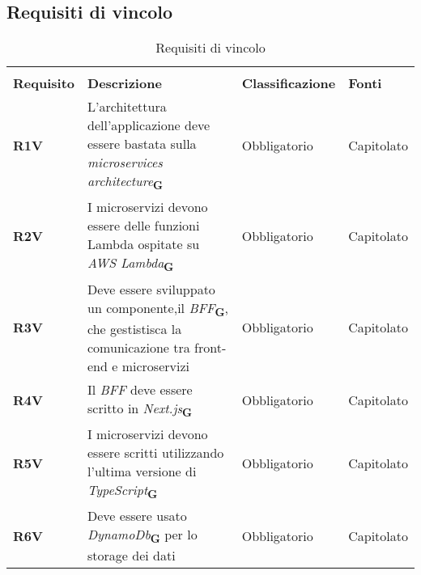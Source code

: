 \subsection{Requisiti di vincolo}
\begin{center}
    \centering
    \renewcommand{\arraystretch}{1.8}
    \label{tab:RequisitiVincolo}
    \begin{longtable}[!h]{p{50px} p{200px} p{100px} p{50px}}
        \rowcolor{white}\caption{Requisiti di vincolo}\\
 \rowcolor{logo!70} \textbf{Requisito} & \textbf{Descrizione}                                                                                                                                     & \textbf{Classificazione} & \textbf{Fonti} \\
        \textbf{R1V}                          & L'architettura dell'applicazione deve essere bastata sulla \textit{microservices architecture}\textsubscript{\textbf{G}}                                 & Obbligatorio             & Capitolato     \\
        \textbf{R2V}                          & I microservizi devono essere delle funzioni \newline Lambda ospitate su \textit{AWS Lambda}\textsubscript{\textbf{G}}                                    & Obbligatorio             & Capitolato     \\
        \textbf{R3V}                          & Deve essere sviluppato un componente,\newline il \textit{BFF}\textsubscript{\textbf{G}}, che gestistisca la comunicazione tra front-end e microservizi   & Obbligatorio             & Capitolato     \\
        \textbf{R4V}                          & Il \textit{BFF} deve essere scritto in \textit{Next.js}\textsubscript{\textbf{G}}                                                                        & Obbligatorio             & Capitolato     \\
        \textbf{R5V}                          & I microservizi devono essere scritti utilizzando l'ultima versione di \textit{TypeScript}\textsubscript{\textbf{G}}                                      & Obbligatorio             & Capitolato     \\
        \textbf{R6V}                          & Deve essere usato \textit{DynamoDb}\textsubscript{\textbf{G}} per lo storage dei dati                                                                    & Obbligatorio             & Capitolato     \\

\end{longtable}
\end{center}
